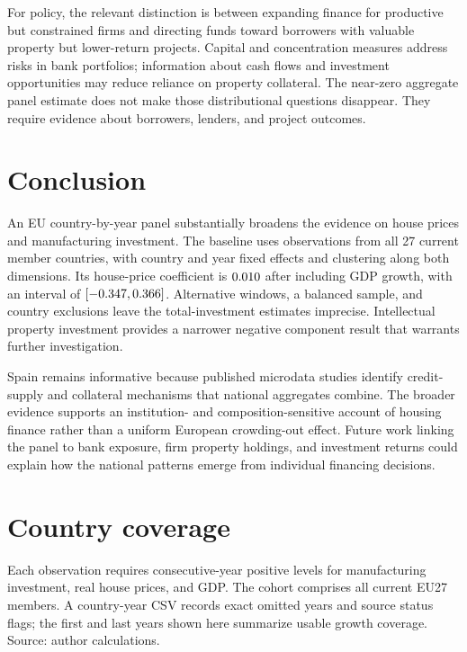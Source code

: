 \documentclass[11pt,letterpaper]{article}
\begin{document}
For policy, the relevant distinction is between expanding finance for productive but constrained firms and directing funds toward borrowers with valuable property but lower-return projects. Capital and concentration measures address risks in bank portfolios; information about cash flows and investment opportunities may reduce reliance on property collateral. The near-zero aggregate panel estimate does not make those distributional questions disappear. They require evidence about borrowers, lenders, and project outcomes.

\section{Conclusion}
An EU country-by-year panel substantially broadens the evidence on house prices and manufacturing investment. The baseline uses \PanelN{} observations from all 27 current member countries, with country and year fixed effects and clustering along both dimensions. Its house-price coefficient is $0.010$ after including GDP growth, with an interval of $[-0.347,0.366]$. Alternative windows, a balanced sample, and country exclusions leave the total-investment estimates imprecise. Intellectual property investment provides a narrower negative component result that warrants further investigation.

Spain remains informative because published microdata studies identify credit-supply and collateral mechanisms that national aggregates combine. The broader evidence supports an institution- and composition-sensitive account of housing finance rather than a uniform European crowding-out effect. Future work linking the panel to bank exposure, firm property holdings, and investment returns could explain how the national patterns emerge from individual financing decisions.

\clearpage
{}

\clearpage\appendix
\renewcommand{\theequation}{\thesection.\arabic{equation}}\setcounter{equation}{0}
\section{Country coverage}\label{app:coverage}
\begin{table}[!htbp]\centering\begin{threeparttable}
\caption{Complete-case baseline observations by country}\label{tab:coverage}
\small{}\setlength{\tabcolsep}{4pt}\renewcommand{\arraystretch}{1.12}

\begin{tablenotes}[flushleft]\footnotesize{}
\item Each observation requires consecutive-year positive levels for manufacturing investment, real house prices, and GDP. The cohort comprises all current EU27 members. A country-year CSV records exact omitted years and source status flags; the first and last years shown here summarize usable growth coverage. Source: author calculations.
\end{tablenotes}\end{threeparttable}\end{table}\FloatBarrier
\end{document}
